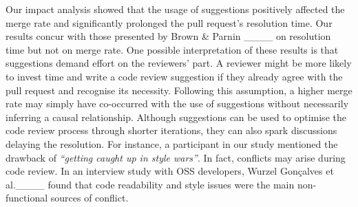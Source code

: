 Our impact analysis showed that the usage of suggestions positively affected the merge rate and significantly prolonged the pull request's resolution time.
Our results concur with those presented by Brown \& Parnin ____ on resolution time but not on merge rate.
One possible interpretation of these results is that suggestions demand effort on the reviewers' part.
A reviewer might be more likely to invest time and write a code review suggestion if they already agree with the pull request and recognise its necessity. 
Following this assumption, a higher merge rate may simply have co-occurred with the use of suggestions without necessarily inferring a causal relationship.
Although suggestions can be used to optimise the code review process through shorter iterations, they can also spark discussions delaying the resolution.
For instance, a participant in our study mentioned the drawback of \textit{``getting caught up in style wars''}.
In fact, conflicts may arise during code review.
In an interview study with OSS developers, Wurzel Gon{\c{c}}alves et al.____ found that code readability and style issues were the main non-functional sources of conflict.


